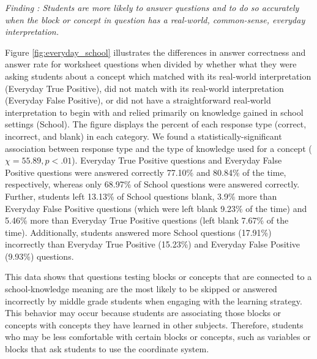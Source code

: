 \textit{Finding : Students are more likely to answer questions and to do so accurately when the block or concept in question has a real-world, common-sense, everyday interpretation.}

Figure \ref{fig:everyday_school} illustrates the differences in answer correctness and answer rate for \ts{} worksheet questions when divided by whether what they were asking students about a concept which matched with its real-world interpretation (Everyday True Positive), did not match with its real-world interpretation (Everyday False Positive), or did not have a straightforward real-world interpretation to begin with and relied primarily on knowledge gained in school settings (School). The figure displays the percent of each response type (correct, incorrect, and blank) in each category. We found a statistically-significant association between response type and the type of knowledge used for a concept ($\chi=55.89, p<.01$). Everyday True Positive questions and Everyday False Positive questions were answered correctly 77.10\% and 80.84\% of the time, respectively, whereas only 68.97\% of School questions were answered correctly. Further, students left 13.13\% of School questions blank, 3.9\% more than Everyday False Positive questions (which were left blank 9.23\% of the time) and 5.46\% more than Everyday True Positive questions (left blank 7.67\% of the time). Additionally, students answered more School questions (17.91\%) incorrectly than Everyday True Positive (15.23\%) and Everyday False Positive (9.93\%) questions.

This data shows that questions testing blocks or concepts that are connected to a school-knowledge meaning are the most likely to be skipped or answered incorrectly by middle grade students when engaging with the \ts{} learning strategy. This behavior may occur because students are associating those blocks or concepts with concepts they have learned in other subjects. Therefore, students who may be less comfortable with certain blocks or concepts, such as variables or blocks that ask students to use the coordinate system.


